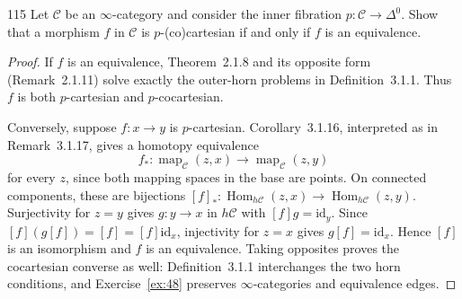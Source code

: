 \begin{exercise}{115}
Let $\mathcal C$ be an $\infty$-category and consider the inner fibration $p\colon\mathcal C\to\Delta^0$. Show
that a morphism $f$ in $\mathcal C$ is $p$-(co)cartesian if and only if $f$ is an equivalence.

\begin{proof}
If $f$ is an equivalence, Theorem~2.1.8 and its opposite form
(Remark~2.1.11) solve exactly the outer-horn problems in Definition~3.1.1.
Thus $f$ is both $p$-cartesian and $p$-cocartesian.

Conversely, suppose $f\colon x\to y$ is $p$-cartesian.
Corollary~3.1.16, interpreted as in Remark~3.1.17, gives a homotopy equivalence
\[
 f_*\colon\operatorname{map}_{\mathcal C}(z,x)
 \longrightarrow\operatorname{map}_{\mathcal C}(z,y)
\]
for every $z$, since both mapping spaces in the base are points.
On connected components, these are bijections
$[f]_*\colon\operatorname{Hom}_{h\mathcal C}(z,x)
\to\operatorname{Hom}_{h\mathcal C}(z,y)$.
Surjectivity for $z=y$ gives $g\colon y\to x$ in $h\mathcal C$ with
$[f]g=\mathrm{id}_y$.
Since $[f](g[f])=[f]=[f]\mathrm{id}_x$, injectivity for $z=x$ gives
$g[f]=\mathrm{id}_x$.
Hence $[f]$ is an isomorphism and $f$ is an equivalence.
Taking opposites proves the cocartesian converse as well:
Definition~3.1.1 interchanges the two horn conditions, and
Exercise~\ref{ex:48} preserves $\infty$-categories and equivalence edges.
\end{proof}
\end{exercise}
